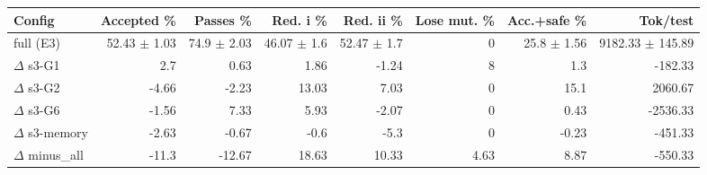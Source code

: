 \begin{tabular}{lrrrrrrr}
\toprule
Config & Accepted \% & Passes \% & Red. i \% & Red. ii \% & Lose mut. \% & Acc.+safe \% & Tok/test \\
\midrule
full (E3) & 52.43 $\pm$ 1.03 & 74.9 $\pm$ 2.03 & 46.07 $\pm$ 1.6 & 52.47 $\pm$ 1.7 & 0 & 25.8 $\pm$ 1.56 & 9182.33 $\pm$ 145.89 \\
$\Delta$ s3-G1 & 2.7 & 0.63 & 1.86 & -1.24 & 8 & 1.3 & -182.33 \\
$\Delta$ s3-G2 & -4.66 & -2.23 & 13.03 & 7.03 & 0 & 15.1 & 2060.67 \\
$\Delta$ s3-G6 & -1.56 & 7.33 & 5.93 & -2.07 & 0 & 0.43 & -2536.33 \\
$\Delta$ s3-memory & -2.63 & -0.67 & -0.6 & -5.3 & 0 & -0.23 & -451.33 \\
$\Delta$ minus\_all & -11.3 & -12.67 & 18.63 & 10.33 & 4.63 & 8.87 & -550.33 \\
\bottomrule
\end{tabular}
